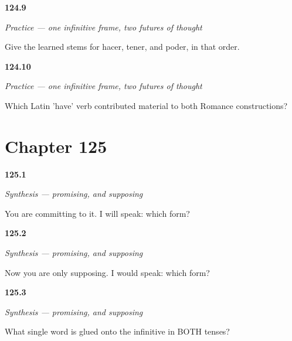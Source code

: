 \noindent\begin{minipage}[t]{\linewidth}
\raggedright
\hypertarget{review-ES-C17-practice-three-stems}{\textbf{124.9}} \emph{Practice — one infinitive frame, two futures of thought}\par
\small Give the learned stems for hacer, tener, and poder, in that order.
\end{minipage}\par\medskip

\noindent\begin{minipage}[t]{\linewidth}
\raggedright
\hypertarget{review-ES-C17-practice-history}{\textbf{124.10}} \emph{Practice — one infinitive frame, two futures of thought}\par
\small Which Latin 'have' verb contributed material to both Romance constructions?
\end{minipage}\par\medskip

\section*{Chapter 125}

\noindent\begin{minipage}[t]{\linewidth}
\raggedright
\hypertarget{review-ES-C17-sintesis-futuro-condicional-promise}{\textbf{125.1}} \emph{Synthesis — promising, and supposing}\par
\small You are committing to it. I will speak: which form?
\end{minipage}\par\medskip

\noindent\begin{minipage}[t]{\linewidth}
\raggedright
\hypertarget{review-ES-C17-sintesis-futuro-condicional-suppose}{\textbf{125.2}} \emph{Synthesis — promising, and supposing}\par
\small Now you are only supposing. I would speak: which form?
\end{minipage}\par\medskip

\noindent\begin{minipage}[t]{\linewidth}
\raggedright
\hypertarget{review-ES-C17-sintesis-futuro-condicional-why}{\textbf{125.3}} \emph{Synthesis — promising, and supposing}\par
\small What single word is glued onto the infinitive in BOTH tenses?
\end{minipage}\par\medskip

